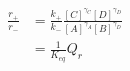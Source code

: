 \begin{eqnarray}
\frac{r_+}{r_-} & = \frac{k_+}{k_-}\frac{[C]^{\gamma_C}[D]^{\gamma_D}}{[A]^{\gamma_A}[B]^{\gamma_D}} \\
&  =  \frac{1}{K_{eq}}{Q_r} \\
\end{eqnarray}